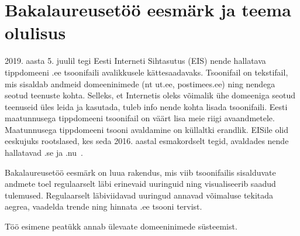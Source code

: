 \documentclass[../main.tex]{subfiles}
\begin{document}
\newpage
\section*{Bakalaureusetöö eesmärk ja teema olulisus}


2019. aasta 5. juulil tegi Eesti Interneti Sihtasutus (EIS) nende hallatava tippdomeeni .ee tsoonifaili avalikkusele kättesaadavaks.
Tsoonifail on tekstifail, mis sisaldab andmeid domeeninimede (nt ut.ee, postimees.ee) ning nendega seotud teenuste kohta.
Selleks, et Internetis oleks võimalik ühe domeeniga seotud teenuseid üles leida ja kasutada, tuleb info nende kohta lisada tsoonifaili.
Eesti maatunnusega tippdomeeni tsoonifail on väärt lisa meie riigi avaandmetele.
Maatunnusega tippdomeeni tsooni avaldamine on küllaltki erandlik.
EISile olid eeskujuks rootslased, kes seda 2016. aastal esmakordselt tegid, avaldades nende hallatavad .se ja .nu~\cite{jurgens2019}.

Bakalaureusetöö eesmärk on luua rakendus, mis viib tsoonifailis sisalduvate andmete toel regulaarselt läbi erinevaid uuringuid ning visualiseerib saadud tulemused.
Regulaarselt läbiviidavad uuringud annavad võimaluse tekitada aegrea, vaadelda trende ning hinnata .ee tsooni tervist.

Töö esimene peatükk annab ülevaate domeeninimede süsteemist.
\end{document}
